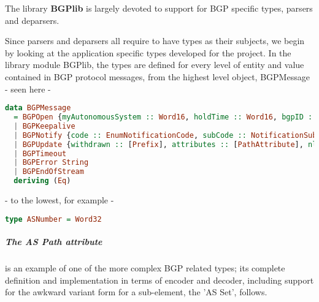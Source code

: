 The library \textbf{BGPlib} is largely devoted to support for BGP specific types, parsers and deparsers.


Since parsers and deparsers all require to have types as their subjects, we begin by looking at the application specific types developed for the project.  In the library module BGPlib, the types are defined for every level of entity and value contained in BGP protocol messages, from the highest level object, BGPMessage - seen here - 

\begin{lstlisting}[language=haskell, title=BGPlib/BGPMessage.hs:30]
data BGPMessage
  = BGPOpen {myAutonomousSystem :: Word16, holdTime :: Word16, bgpID :: IPv4, caps :: [Capability]}
  | BGPKeepalive
  | BGPNotify {code :: EnumNotificationCode, subCode :: NotificationSubcode, errorData :: L.ByteString}
  | BGPUpdate {withdrawn :: [Prefix], attributes :: [PathAttribute], nlri :: [Prefix]}
  | BGPTimeout
  | BGPError String
  | BGPEndOfStream
  deriving (Eq)
\end{lstlisting}

 - to the lowest, for example -  
\begin{lstlisting}[language=haskell, title=BGPlib/ASPath.hs:19]
type ASNumber = Word32
\end{lstlisting}

\subparagraph{The AS Path attribute}
 is an example of one of the more complex BGP related types; its complete definition and implementation in terms of encoder and decoder, including  support for the awkward variant form for a sub-element, the 'AS Set', follows.


